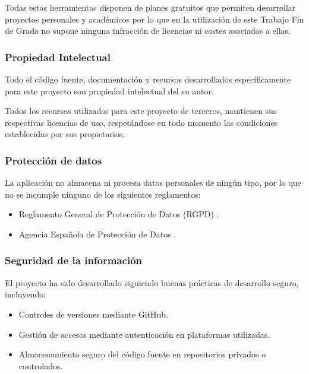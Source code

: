 Todas estas herramientas disponen de planes gratuitos que permiten desarrollar proyectos personales y académicos por lo que en la utilización de este Trabajo Fin de Grado no supone ninguna infracción de licencias ni costes asociados a ellas.

\subsubsection{Propiedad Intelectual}

Todo el código fuente, documentación y recursos desarrollados específicamente para este proyecto son propiedad intelectual del su autor.

Todos los recursos utilizados para este proyecto de terceros, mantienen sus respectivas licencias de uso, respetándose en todo momento las condiciones establecidas por sus propietarios.

\subsubsection{Protección de datos}

La aplicación no almacena ni procesa datos personales de ningún tipo, por lo que no se incumple ninguno de los siguientes reglamentos:

\begin{itemize}
    \item Reglamento General de Protección de Datos (RGPD) \cite{rgpd2016}.
    \item Agencia Española de Protección de Datos \cite{lopdgdd2018}.
\end{itemize}

\subsubsection{Seguridad de la información}

El proyecto ha sido desarrollado siguiendo buenas prácticas de desarrollo seguro, incluyendo:

\begin{itemize}
    \item Controles de versiones mediante GitHub.
    \item Gestión de accesos mediante autenticación en plataformas utilizadas.
    \item Almacenamiento seguro del código fuente en repositorios privados o controlados.
\end{itemize}


